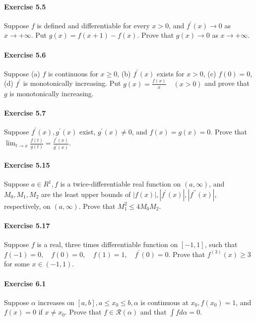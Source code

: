 \documentclass{article}
\begin{document}
\paragraph{Exercise 5.5} Suppose $f$ is defined and differentiable for every $x>0$, and $f^{\prime}(x) \rightarrow 0$ as $x \rightarrow+\infty$. Put $g(x)=f(x+1)-f(x)$. Prove that $g(x) \rightarrow 0$ as $x \rightarrow+\infty$.

\paragraph{Exercise 5.6} Suppose (a) $f$ is continuous for $x \geq 0$, (b) $f^{\prime}(x)$ exists for $x>0$, (c) $f(0)=0$, (d) $f^{\prime}$ is monotonically increasing. Put $g(x)=\frac{f(x)}{x} \quad(x>0)$ and prove that $g$ is monotonically increasing.

\paragraph{Exercise 5.7} Suppose $f^{\prime}(x), g^{\prime}(x)$ exist, $g^{\prime}(x) \neq 0$, and $f(x)=g(x)=0$. Prove that $\lim _{t \rightarrow x} \frac{f(t)}{g(t)}=\frac{f^{\prime}(x)}{g^{\prime}(x)}.$

\paragraph{Exercise 5.15} Suppose $a \in R^{1}, f$ is a twice-differentiable real function on $(a, \infty)$, and $M_{0}, M_{1}, M_{2}$ are the least upper bounds of $|f(x)|,\left|f^{\prime}(x)\right|,\left|f^{\prime \prime}(x)\right|$, respectively, on $(a, \infty)$. Prove that $M_{1}^{2} \leq 4 M_{0} M_{2} .$

\paragraph{Exercise 5.17} Suppose $f$ is a real, three times differentiable function on $[-1,1]$, such that $f(-1)=0, \quad f(0)=0, \quad f(1)=1, \quad f^{\prime}(0)=0 .$ Prove that $f^{(3)}(x) \geq 3$ for some $x \in(-1,1)$.

\paragraph{Exercise 6.1} Suppose $\alpha$ increases on $[a, b], a \leq x_{0} \leq b, \alpha$ is continuous at $x_{0}, f\left(x_{0}\right)=1$, and $f(x)=0$ if $x \neq x_{0}$. Prove that $f \in \mathcal{R}(\alpha)$ and that $\int f d \alpha=0$.
\end{document}
